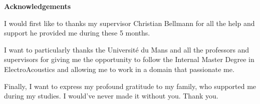 \documentclass{report}
\newif\ifdraft
\begin{document}




\ifdraft
\listoftodos
\else
\thispagestyle{empty}
\begin{center}
{\Large\textbf{Acknowledgements}} 
\end{center}
\vspace{1cm}
I would first like to thanks my supervisor Christian Bellmann for all the help and support he provided me during these 5 months. 

\vspace{0.5cm}

I want to particularly thanks the Université du Mans and all the professors and supervisors for giving me the opportunity to follow the Internal Master Degree in ElectroAcoustics and allowing me to work in a domain that passionate me. 

\vspace{0.5cm}

Finally, I want to express my profound gratitude to my family, who supported me during my studies. I would've never made it without you. Thank you.

\vfill %
\fi	%


\clearpage
\renewcommand\contentsname{Table of contents}
\tableofcontents
{} %

\clearpage
\listoffigures
{}

\clearpage
\listofmyequations
{}


    
\end{document}
